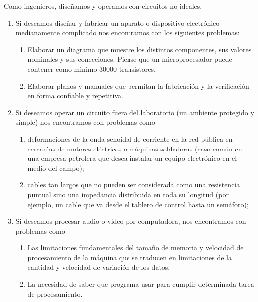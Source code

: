  Como ingenieros, dise\~{n}amos y operamos con circuitos no ideales.
 \begin{enumerate}
 \item Si deseamos dise\~{n}ar y fabricar un aparato o dispositivo
   electr\'{o}nico medianamente complicado nos encontramos con los
   siguientes problemas:
   \begin{enumerate}
   \item Elaborar un diagrama que muestre los distintos componentes,
     sus valores nominales y sus conecciones. Piense que un
     microprocesador puede contener como m\'{\i}nimo $30000$
     transistores.
   \item Elaborar planos y manuales que permitan la fabricaci\'{o}n y
     la verificaci\'{o}n en forma confiable y repetitiva.
   \end{enumerate}
                
 \item Si deseamos operar un circuito fuera del laboratorio (un
   ambiente protegido y simple) nos encontramos con problemas como
   \begin{enumerate}
   \item deformaciones de la onda senoidal de corriente en la red
     p\'{u}blica en cercan\'{\i}as de motores el\'{e}ctricos o
     m\'{a}quinas soldadoras (caso com\'{u}n en una empresa petrolera
     que desea instalar un equipo electr\'{o}nico en el medio del
     campo);

   \item cables tan largos que no pueden ser considerada como una
     resistencia puntual sino una impedancia distribuida en toda su
     longitud (por ejemplo, un cable que va desde el tablero de control
     hasta un sem\'{a}foro);

   \end{enumerate}

 \item Si deseamos procesar audio o video por computadora, nos
   encontramos con problemas como
   \begin{enumerate}
   \item Las limitaciones fundamentales del tama\~{n}o de memoria y
     velocidad de procesamiento de la m\'{a}quina que se traducen en
     limitaciones de la cantidad y velocidad de variaci\'{o}n de los
     datos.
                        
   \item La necesidad de saber que programa usar para cumplir
     determinada tarea de procesamiento.
   \end{enumerate}
 \end{enumerate}


